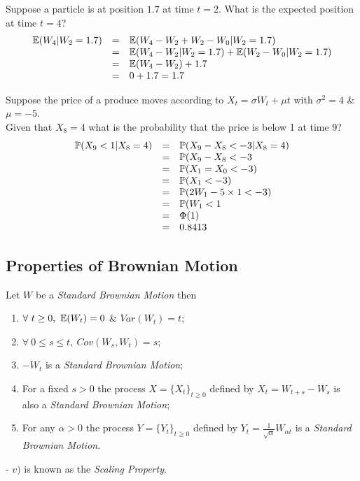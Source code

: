\documentclass[11pt,a4paper]{article}
\begin{document}
Suppose a particle is at position $1.7$ at time $t=2$. What is the expected position at time $t=4$?
\[\begin{array}{rcl}
\mathbb{E}(W_4|W_2=1.7)&=&\mathbb{E}(W_4-W_2+W_2-W_0|W_2=1.7)\\
&=&\mathbb{E}(W_4-W_2|W_2=1.7)+\mathbb{E}(W_2-W_0|W_2=1.7)\\
&=&\mathbb{E}(W_4-W_2)+1.7\\
&=&0+1.7 = 1.7
\end{array}\]

Suppose the price of a produce moves according to $X_t=\sigma W_t+\mu t$ with $\sigma^2=4$ \& $\mu=-5$.\\
Given that $X_8=4$ what is the probability that the price is below 1 at time 9?
\[\begin{array}{rcl}
\mathbb{P}(X_9<1|X_8=4)&=&\mathbb{P}(X_9-X_8<-3|X_8=4)\\
&=&\mathbb{P}(X_9-X_8<-3\\
&=&\mathbb{P}(X_1=X_0<-3)\\
&=&\mathbb{P}(X_1<-3)\\
&=&\mathbb{P}(2W_1-5\times1<-3)\\
&=&\mathbb{P}(W_1<1\\
&=&\Phi(1)\\
&=&0.8413
\end{array}\]

\subsection{Properties of Brownian Motion}

Let $W$ be a \textit{Standard Brownian Motion} then
\begin{enumerate}[label=\roman*)]
	\item $\forall\ t\geq0,\ \expect(W_t)=0$ \& $Var(W_t)=t$;
	\item $\forall\ 0\leq s\leq t,\ Cov(W_s,W_t)=s$;
	\item $-W_t$ is a \textit{Standard Brownian Motion};
	\item For a fixed $s>0$ the process $X=\{X_t\}_{t\geq0}$ defined by $X_t=W_{t+s}-W_s$ is also a \textit{Standard Brownian Motion};
	\item For any $\alpha>0$ the process $Y=\{Y_t\}_{t\geq0}$ defined by $Y_t=\frac{1}{\sqrt{\alpha}}W_{\alpha t}$ is a \textit{Standard Brownian Motion}.
\end{enumerate}
\nb - $v)$ is known as the \textit{Scaling Property}.\\
\end{document}
